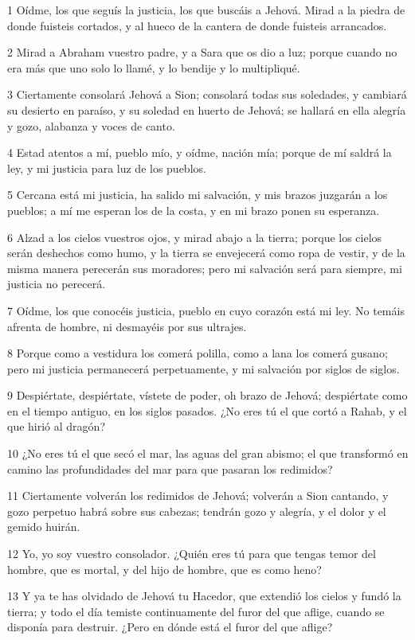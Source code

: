 \par 1 Oídme, los que seguís la justicia, los que buscáis a Jehová. Mirad a la piedra de donde fuisteis cortados, y al hueco de la cantera de donde fuisteis arrancados.
\par 2 Mirad a Abraham vuestro padre, y a Sara que os dio a luz; porque cuando no era más que uno solo lo llamé, y lo bendije y lo multipliqué.
\par 3 Ciertamente consolará Jehová a Sion; consolará todas sus soledades, y cambiará su desierto en paraíso, y su soledad en huerto de Jehová; se hallará en ella alegría y gozo, alabanza y voces de canto.
\par 4 Estad atentos a mí, pueblo mío, y oídme, nación mía; porque de mí saldrá la ley, y mi justicia para luz de los pueblos.
\par 5 Cercana está mi justicia, ha salido mi salvación, y mis brazos juzgarán a los pueblos; a mí me esperan los de la costa, y en mi brazo ponen su esperanza.
\par 6 Alzad a los cielos vuestros ojos, y mirad abajo a la tierra; porque los cielos serán deshechos como humo, y la tierra se envejecerá como ropa de vestir, y de la misma manera perecerán sus moradores; pero mi salvación será para siempre, mi justicia no perecerá.
\par 7 Oídme, los que conocéis justicia, pueblo en cuyo corazón está mi ley. No temáis afrenta de hombre, ni desmayéis por sus ultrajes.
\par 8 Porque como a vestidura los comerá polilla, como a lana los comerá gusano; pero mi justicia permanecerá perpetuamente, y mi salvación por siglos de siglos.
\par 9 Despiértate, despiértate, vístete de poder, oh brazo de Jehová; despiértate como en el tiempo antiguo, en los siglos pasados. ¿No eres tú el que cortó a Rahab, y el que hirió al dragón?
\par 10 ¿No eres tú el que secó el mar, las aguas del gran abismo; el que transformó en camino las profundidades del mar para que pasaran los redimidos?
\par 11 Ciertamente volverán los redimidos de Jehová; volverán a Sion cantando, y gozo perpetuo habrá sobre sus cabezas; tendrán gozo y alegría, y el dolor y el gemido huirán.
\par 12 Yo, yo soy vuestro consolador. ¿Quién eres tú para que tengas temor del hombre, que es mortal, y del hijo de hombre, que es como heno?
\par 13 Y ya te has olvidado de Jehová tu Hacedor, que extendió los cielos y fundó la tierra; y todo el día temiste continuamente del furor del que aflige, cuando se disponía para destruir. ¿Pero en dónde está el furor del que aflige?
